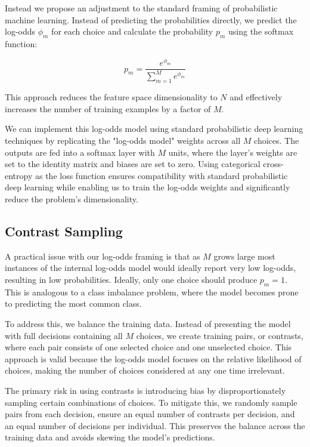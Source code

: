 \documentclass[11pt]{article}
\begin{document}
Instead we propose an adjustment to the standard framing of probabilistic machine learning. Instead of predicting the probabilities directly, we predict the log-odds $\phi_m$ for each choice and calculate the probability $p_m$ using the softmax function:

$$p_m = \frac{e^{\phi_m}}{\sum_{m=1}^{M}e^{\phi_m}}$$

This approach reduces the feature space dimensionality to $N$ and effectively increases the number of training examples by a factor of $M$.

We can implement this log-odds model using standard probabilistic deep learning techniques by replicating the "log-odds model" weights across all $M$ choices. The outputs are fed into a softmax layer with $M$ units, where the layer's weights are set to the identity matrix and biases are set to zero. Using categorical cross-entropy as the loss function ensures compatibility with standard probabilistic deep learning while enabling us to train the log-odds weights and significantly reduce the problem's dimensionality.

\subsection*{Contrast Sampling}

A practical issue with our log-odds framing is that as $M$ grows large most instances of the internal log-odds model would ideally report very low log-odds, resulting in low probabilities. Ideally, only one choice should produce $p_m=1$. This is analogous to a class imbalance problem, where the model becomes prone to predicting the most common class.

To address this, we balance the training data. Instead of presenting the model with full decisions containing all $M$ choices, we create training pairs, or contrasts, where each pair consists of one selected choice and one unselected choice. This approach is valid because the log-odds model focuses on the relative likelihood of choices, making the number of choices considered at any one time irrelevant.

The primary risk in using contrasts is introducing bias by disproportionately sampling certain combinations of choices. To mitigate this, we randomly sample pairs from each decision, ensure an equal number of contrasts per decision, and an equal number of decisions per individual. This preserves the balance across the training data and avoids skewing the model's predictions.
\end{document}
